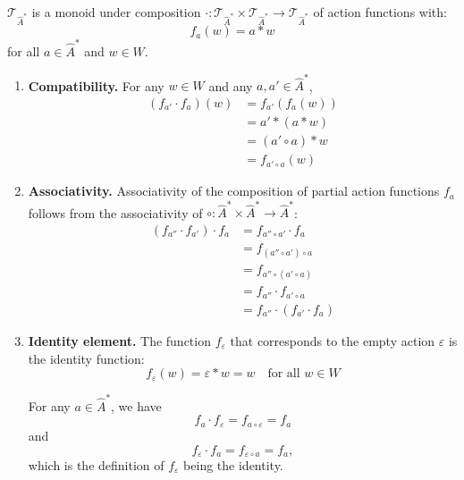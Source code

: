 \begin{propositionE}
    \label{prp:T_is_monoid}
    $\mathcal{T}_{\hat{A}^{*}}$ is a monoid under composition $\cdot: \mathcal{T}_{\hat{A}^{*}} \times \mathcal{T}_{\hat{A}^{*}} \to \mathcal{T}_{\hat{A}^{*}}$ of action functions with:
    \begin{equation}
        f_{a}(w) = a \ast w
    \end{equation}
    for all $a \in \hat{A}^{*}$ and $w \in W$.
\end{propositionE}
\begin{proofE}
\begin{enumerate}
    \item \textbf{Compatibility.}
    For any $w \in W$ and any $a, a' \in \hat{A}^{*}$,
    \begin{align}
        (f_{a'} \cdot f_{a})(w) & = f_{a'} (f_{a}(w)) \\
        & = a' \ast (a \ast w) \\
        & = (a' \circ a) \ast w \\
        & = f_{a' \circ a}(w)
    \end{align}

    \item \textbf{Associativity.}
    Associativity of the composition of partial action functions $f_{a}$ follows from the associativity of $\circ: \hat{A}^{*} \times \hat{A}^{*} \to \hat{A}^{*}$:
    \begin{align}
      (f_{a''} \cdot f_{a'}) \cdot f_{a} & = f_{a'' \circ a'} \cdot f_{a}       \\
                                         & = f_{(a'' \circ a') \circ a}         \\
                                         & = f_{a'' \circ (a' \circ a)}         \\
                                         & = f_{a''} \cdot f_{a' \circ a}       \\
                                         & = f_{a''} \cdot (f_{a'} \cdot f_{a})
    \end{align}
    \item \textbf{Identity element.}
    The function $f_{\varepsilon}$ that corresponds to the empty action $\varepsilon$ is the identity function:
    \begin{equation}
      f_{\varepsilon}(w) = \varepsilon \ast w = w \quad \text{for all $w \in W$}
    \end{equation}

    For any $a \in \hat{A}^{*}$, we have
    \begin{equation}
        f_{a} \cdot f_{\varepsilon} = f_{a \circ \varepsilon} = f_{a}
    \end{equation}
    and
    \begin{equation}
        f_{\varepsilon} \cdot f_{a} = f_{\varepsilon \circ a} = f_{a},
    \end{equation}
    which is the definition of $f_{\varepsilon}$ being the identity.
\end{enumerate}
\end{proofE}


